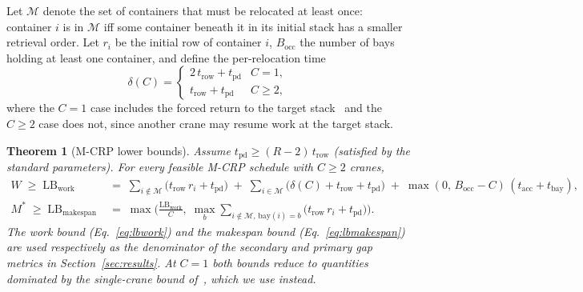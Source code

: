 \documentclass[11pt,a4paper]{elsarticle}
\newtheorem{theorem}{Theorem}[section]
\newcommand{\LB}{\text{LB}}
\begin{document}
Let $\mathcal{M}$ denote the set of containers that must be relocated at least once: container $i$ is in $\mathcal{M}$ iff some container beneath it in its initial stack has a smaller retrieval order. Let $r_i$ be the initial row of container $i$, $B_{\text{occ}}$ the number of bays holding at least one container, and define the per-relocation time
\begin{equation*}
    \delta(C) = \begin{cases} 2\,t_{\text{row}} + t_{\text{pd}} & C = 1,\\ t_{\text{row}} + t_{\text{pd}} & C \ge 2, \end{cases}
\end{equation*}
where the $C=1$ case includes the forced return to the target stack~\cite{shin2026} and the $C\ge2$ case does not, since another crane may resume work at the target stack.

\begin{theorem}[M-CRP lower bounds]
\label{thm:lb}
Assume $t_{\text{pd}} \ge (R-2)\,t_{\text{row}}$ (satisfied by the standard parameters). For every feasible M-CRP schedule with $C \ge 2$ cranes,
\begin{align}
    W \;\ge\; \LB_{\text{work}} \;&=\; \sum_{i \notin \mathcal{M}} \big( t_{\text{row}}\, r_i + t_{\text{pd}} \big)
    \;+\; \sum_{i \in \mathcal{M}} \big( \delta(C) + t_{\text{row}} + t_{\text{pd}} \big)
    \;+\; \max(0,\, B_{\text{occ}} - C)\,(t_{\text{acc}} + t_{\text{bay}}), \label{eq:lbwork}\\
    M^\ast \;\ge\; \LB_{\text{makespan}} \;&=\; \max\Big( \tfrac{\LB_{\text{work}}}{C},\; \max_{b} \textstyle\sum_{i \notin \mathcal{M},\, \text{bay}(i)=b} \big( t_{\text{row}}\, r_i + t_{\text{pd}} \big) \Big). \label{eq:lbmakespan}
\end{align}
The work bound (Eq.~\ref{eq:lbwork}) and the makespan bound (Eq.~\ref{eq:lbmakespan}) are used respectively as the denominator of the secondary and primary gap metrics in Section~\ref{sec:results}. At $C=1$ both bounds reduce to quantities dominated by the single-crane bound of~\cite{shin2026}, which we use instead.
\end{theorem}
\end{document}
